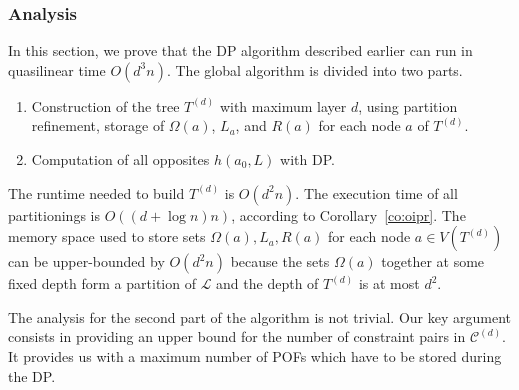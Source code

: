 \documentclass[a4paper,UKenglish,numberwithinsect,cleveref, autoref]{lipics-v2021}
\begin{document}
\subsubsection{Analysis} \label{subsubsec:analysis_wopp}

In this section, we prove that the DP algorithm described earlier can run in quasilinear time $O(d^3n)$. The global algorithm is divided into two parts.
\begin{enumerate}
\item Construction of the tree $T^{(d)}$ with maximum layer $d$, using partition refinement, storage of $\Omega(a)$, $L_a$, and $R(a)$ for each node $a$ of $T^{(d)}$.
\item Computation of all opposites $h(a_0,L)$ with DP.
\end{enumerate}
The runtime needed to build $T^{(d)}$ is $O(d^2n)$. The execution time of all partitionings is $O((d+\log n)n)$, according to Corollary~\ref{co:oipr}.
The memory space used to store sets $\Omega(a),L_a,R(a)$ for each node $a\in V(T^{(d)})$ can be upper-bounded by $O(d^2n)$ because the sets $\Omega(a)$ together at some fixed depth form a partition of $\mathcal{L}$ and the depth of $T^{(d)}$ is at most $d^2$.

The analysis for the second part of the algorithm is not trivial. Our key argument consists in providing an upper bound for the number of constraint pairs in $\mathcal{C}^{(d)}$. It provides us with a maximum number of POFs which have to be stored during the DP.
\end{document}

